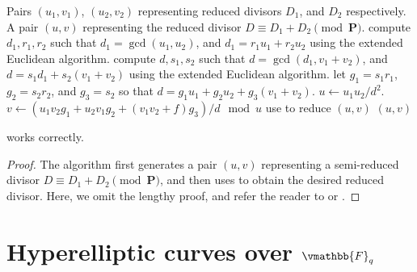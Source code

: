 \begin{algorithm}
\label{algorithm:Cantor-add}
\begin{algorithmic}[1]
\REQUIRE Pairs $(u_1, v_1)$, $(u_2, v_2)$ representing reduced divisors $D_1$, and $D_2$ 
respectively.
\ENSURE  A pair $(u, v)$ representing the reduced divisor $D \equiv D_1 + D_2 \pmod {\mathbf{P}}$.
\STATE compute $d_1, r_1, r_2$ such that $d_1 = \gcd(u_1, u_2)$, and $d_1 = r_1u_1 + r_2u_2$ using 
the extended Euclidean algorithm.
\STATE compute $d, s_1, s_2$ such that $d = \gcd(d_1, v_1 + v_2)$, and $d = s_1d_1 + s_2(v_1 + v_2)$ 
using the extended Euclidean algorithm.
\STATE let $g_1 = s_1r_1$, $g_2 = s_2r_2$, and $g_3 = s_2$ so that $d = g_1u_1 + g_2u_2 + g_3(v_1 + 
v_2)$.
\STATE $u \leftarrow u_1u_2 / d^2$.
\STATE $v \leftarrow (u_1v_2g_1 + u_2v_1g_2 + (v_1v_2 + f)g_3) / d \mod u$
\STATE use  to reduce $(u, v)$
\RETURN $(u, v)$
\end{algorithmic}
\end{algorithm}

\begin{theorem}
 works correctly.
\end{theorem}
\begin{proof}
The algorithm first generates a pair $(u, v)$ representing a semi-reduced divisor $D \equiv D_1 + 
D_2 \pmod {\mathbf{P}}$, and then uses  to obtain the desired 
reduced divisor. Here, we omit the lengthy proof, and refer the reader to \cite[ch. 
13]{Washington2008} or \cite[appendix]{Koblitz1998}.
\end{proof}









\section{Hyperelliptic curves over $\vmathbb{F}_q$}
\label{section:hyper-ff}

